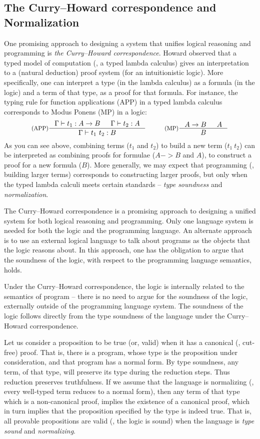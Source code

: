 \subsection{The Curry--Howard correspondence and Normalization}
\label{sec:intro:concepts:CH}
One promising approach to designing a system that unifies
logical reasoning and programming is \emph{the Curry--Howard correspondence}.
Howard \cite{Howard69} observed that a typed model of computation
(\ie, a typed lambda calculus) gives an interpretation to a (natural deduction)
proof system (for an intuitionistic logic). More specifically, one can interpret
a type (in the lambda calculus) as a formula (in the logic) and
a term of that type, as a proof for that formula. For instance,
the typing rule for function applications (APP) in a typed lambda calculus
corresponds to Modus Ponens (MP) in a logic:
\[ \inference[(APP)]{\Gamma |- t_1 : A -> B & \Gamma |- t_2 : A}{
        \Gamma |- t_1~t_2 : B}
 ~~~~~~~~
   \inference[(MP)]{A -> B & A}{B}
\]
As you can see above, combining terms ($t_1$ and $t_2$) to build a new term
($t_1~t_2$) can be interpreted as combining proofs for formulae
($A -> B$ and $A$), to construct a proof for a new formula ($B$).
More generally, we may expect that programming (\ie, building larger terms)
corresponds to constructing larger proofs, but only when the typed lambda calculi
meets certain standards -- \emph{type soundness} and \emph{normalization}.

The Curry--Howard correspondence is a promising approach to designing a
unified system for both logical reasoning and programming. Only one language
system is needed for both the logic and the programming language. An
alternate approach is to use an external logical language to talk about
programs as the objects that the logic reasons about. In this approach, one
has the obligation to argue that the soundness of the logic, with respect to
the programming language semantics, holds.

Under the Curry--Howard correspondence, the logic is internally related to the
semantics of program -- there is no need to argue for the soundness of the
logic,  externally outside of the programming language system. The soundness
of the logic follows directly from the type soundness of the language under
the Curry--Howard correspondence.

Let us consider a proposition to be true
(or, valid) when it has a canonical (\ie, cut-free) proof.
That is, there is a program, whose type is the proposition under
consideration, and that program has a normal form. 
By type soundness, any term,
of that type, will preserve its type during the reduction steps. Thus
reduction preserves truthfulness. If we assume
that the language is normalizing (\ie, every well-typed term reduces to
a normal form), then any term of that type which is a non-canonical proof,
implies the existence of a canonical proof, which in turn implies that
the proposition specified by the type is indeed true. That is, all provable
propositions are valid (\ie, the logic is sound) when the language is
\emph{type sound} and \emph{normalizing}.

